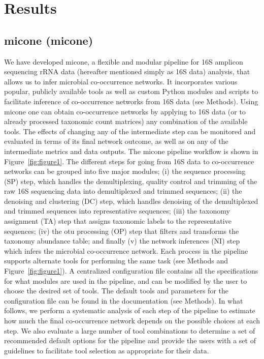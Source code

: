 
\section*{Results}

  \subsection*{\acl{micone} (\acs{micone})}

  We have developed \ac{micone}, a flexible and modular pipeline for 16S amplicon sequencing rRNA data (hereafter mentioned simply as 16S data) analysis, that allows us to infer microbial co-occurrence networks.
  It incorporates various popular, publicly available tools as well as custom Python modules and scripts to facilitate inference of co-occurrence networks from 16S data (see Methods).
  Using \ac{micone} one can obtain co-occurrence networks by applying to 16S data (or to already processed taxonomic count matrices) any combination of the available tools.
  The effects of changing any of the intermediate step can be monitored and evaluated in terms of its final network outcome, as well as on any of the intermediate metrics and data outputs.
  The \ac{micone} pipeline workflow is shown in Figure~\ref{fig:figure1}.
  The different steps for going from 16S data to co-occurrence networks can be grouped into five major modules; (i) the sequence processing (SP) step, which handles the demultiplexing, quality control and trimming of the raw 16S sequencing data into demultiplexed and trimmed sequences; (ii) the denoising and clustering (DC) step, which handles denoising of the demultiplexed and trimmed sequences into representative sequences; (iii) the taxonomy assignment (TA) step that assigns taxonomic labels to the representative sequences; (iv) the \ac{otu} processing (OP) step that filters and transforms the taxonomy abundance table; and finally (v) the network inferences (NI) step which infers the microbial co-occurrence network.
  Each process in the pipeline supports alternate tools for performing the same task (see Methods and Figure~\ref{fig:figure1}).
  A centralized configuration file contains all the specifications for what modules are used in the pipeline, and can be modified by the user to choose the desired set of tools.
  The default tools and parameters for the configuration file can be found in the documentation (see Methods).
  In what follows, we perform a systematic analysis of each step of the pipeline to estimate how much the final co-occurrence network depends on the possible choices at each step.
  We also evaluate a large number of tool combinations to determine a set of recommended default options for the pipeline and provide the users with a set of guidelines to facilitate tool selection as appropriate for their data.

